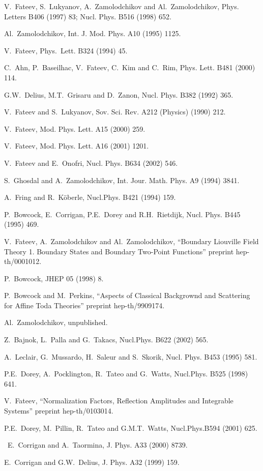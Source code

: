 \documentclass[a4paper,12pt,titlepage,final]{article}
\begin{document}
\begin{thebibliography}{99}
  V.\ Fateev, S.\ Lukyanov, A.\ Zamolodchikov and Al.\
Zamolodchikov,
Phys. Letters B406 (1997) 83; Nucl. Phys. B516 (1998) 652.

  Al.\ Zamolodchikov, Int. J. Mod. Phys. A10 (1995) 1125.

  V.\  Fateev, Phys.\  Lett. B324 (1994) 45.

 C.\ Ahn, P.\ Baseilhac, V.\ Fateev, C.\ Kim and C.\ Rim,
Phys. Lett.  B481 (2000) 114.

  G.W.\ Delius, M.T.\ Grisaru and D.\ Zanon, Nucl. Phys.
B382 (1992)
365.

  V.\ Fateev and S.\ Lukyanov, Sov. Sci. Rev. A212 (Physics)
(1990)
212.

  V.\ Fateev, Mod. Phys. Lett. A15 (2000) 259.

  V.\ Fateev, Mod. Phys. Lett. A16 (2001) 1201.


  V.\ Fateev and E.\ Onofri, Nucl. Phys. B634 (2002) 546.

  S.\ Ghosdal and A.\ Zamolodchikov, Int. Jour. Math. Phys. A9
(1994) 3841.

  A.\ Fring and R.\ K\"{o}berle, Nucl.Phys. B421 (1994) 159.

  P.\ Bowcock, E.\ Corrigan, P.E.\ Dorey and R.H.\
Rietdijk, Nucl.
Phys. B445 (1995) 469.

  V.\ Fateev, A.\ Zamolodchikov and Al.\ Zamolodchikov,
``Boundary
Liouville Field Theory 1. Boundary States and Boundary Two-Point Functions''
preprint hep-th/0001012.

  P.\ Bowcock, JHEP 05 (1998) 8.

  P.\ Bowcock and M.\ Perkins, ``Aspects of Classical
Backgrownd
and Scattering for Affine Toda Theories'' preprint hep-th/9909174.

\bibitem{AlZ}  Al.\ Zamolodchikov, unpublished.

   Z.\ Bajnok, L.\ Palla and G.\ Takacs, Nucl.Phys. B622
(2002) 565.

  A.\ Leclair, G.\ Mussardo, H.\ Saleur and S.\ Skorik,
Nucl. Phys.
B453 (1995) 581.

  P.E.\ Dorey, A.\ Pocklington, R.\ Tateo and G.\ Watts,
Nucl.Phys. B525 (1998) 641.

  V.\ Fateev, ``Normalization Factors, Reflection
Amplitudes and
Integrable Systems'' preprint hep-th/0103014.

  P.E.\ Dorey, M.\ Pillin, R.\ Tateo and G.M.T.\ Watts,
Nucl.Phys.B594
(2001) 625.

  \ E.\ Corrigan and A.\ Taormina, J. Phys. A33 (2000) 8739.

\bibitem{CDE}  E.\ Corrigan and G.W.\ Delius, J. Phys. A32 (1999) 159.
\end{thebibliography}
\end{document}
